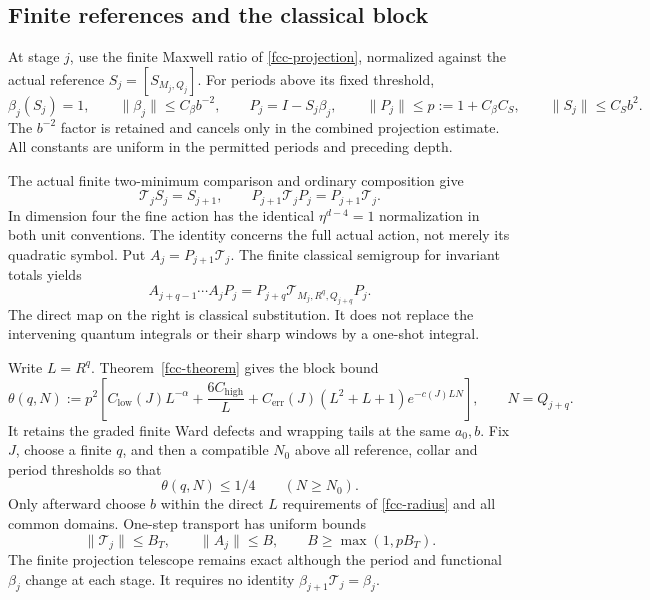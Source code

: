 \subsection{Finite references and the classical block}
\label{fqi-classical-section}

At stage $j$, use the finite Maxwell ratio of
\eqref{fcc-projection}, normalized against the actual reference
$S_j=[S_{M_j,Q_j}]$. For periods above its fixed threshold,
\begin{equation}
 \beta_j(S_j)=1,\qquad
 \|\beta_j\|\le C_\beta b^{-2},\qquad
 P_j=I-S_j\beta_j,\qquad
 \|P_j\|\le p:=1+C_\beta C_S,\qquad
 \|S_j\|\le C_Sb^2.
 \label{fqi-projections}
\end{equation}
The $b^{-2}$ factor is retained and cancels only in the
combined projection estimate. All constants are uniform in
the permitted periods and preceding depth.

The actual finite two-minimum comparison and ordinary
composition give
\begin{equation}
 \mathcal T_jS_j=S_{j+1},\qquad
 P_{j+1}\mathcal T_jP_j=P_{j+1}\mathcal T_j.
 \label{fqi-reference-telescope}
\end{equation}
In dimension four the fine action has the identical
$\eta^{d-4}=1$ normalization in both unit conventions.
The identity concerns the full actual action, not merely
its quadratic symbol. Put $A_j=P_{j+1}\mathcal T_j$.
The finite classical semigroup for invariant totals yields
\begin{equation}
 A_{j+q-1}\cdots A_jP_j
     =P_{j+q}\mathcal T_{M_j,R^q,Q_{j+q}}P_j.
 \label{fqi-block-telescope}
\end{equation}
The direct map on the right is classical substitution.
It does not replace the intervening quantum integrals or
their sharp windows by a one-shot integral.

Write $L=R^q$. Theorem~\ref{fcc-theorem} gives the block bound
\begin{equation}
 \theta(q,N):=p^2\left[
 C_{\mathrm{low}}(J)L^{-\alpha}+\frac{6C_{\mathrm{high}}}L
 +C_{\mathrm{err}}(J)(L^2+L+1)e^{-c(J)LN}\right],
 \qquad N=Q_{j+q}.
 \label{fqi-classical-block-bound}
\end{equation}
It retains the graded finite Ward defects and wrapping tails
at the same $a_0,b$. Fix $J$, choose a finite $q$, and then
a compatible $N_0$ above all reference, collar and period
thresholds so that
\begin{equation}
                 \theta(q,N)\le1/4\qquad(N\ge N_0).
 \label{fqi-period-threshold}
\end{equation}
Only afterward choose $b$ within the direct $L$ requirements
of \eqref{fcc-radius} and all common domains. One-step
transport has uniform bounds
\begin{equation}
 \|\mathcal T_j\|\le B_T,\qquad
 \|A_j\|\le B,\qquad B\ge\max(1,pB_T).
 \label{fqi-one-step-bound}
\end{equation}
The finite projection telescope remains exact although the
period and functional $\beta_j$ change at each stage.
It requires no identity $\beta_{j+1}\mathcal T_j=\beta_j$.

